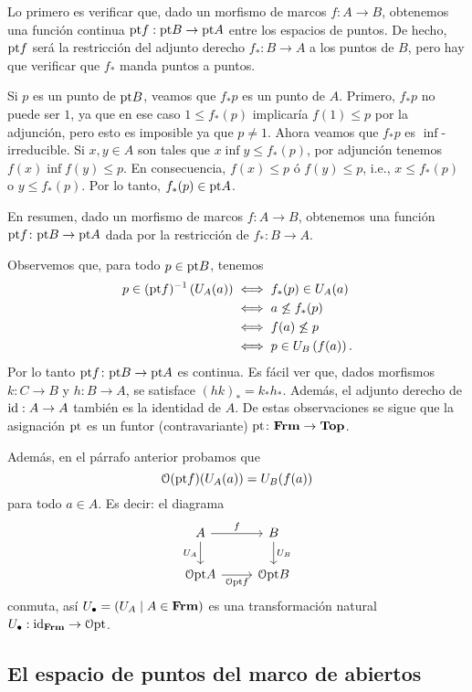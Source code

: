 \documentclass{comunicaciones}
\begin{document}
Lo primero es verificar que, dado un morfismo de marcos $f\colon A\to B$,
obtenemos una función continua $\mathrm{pt} f:\mathrm{pt} B\to\mathrm{pt} A$ entre los
espacios de puntos. De hecho, $\mathrm{pt} f$ será la restricción del adjunto
derecho $f_*\colon B\to A$ a los puntos de $B$, pero hay que verificar que
$f_*$ manda puntos a puntos.

Si $p$ es un punto de $\mathrm{pt} B$, veamos que $f_*p$ es un punto de $A$.
Primero, $f_*p$ no puede ser $1$, ya que en ese caso $1\leq f_\ast(p)$
implicaría $f(1)\leq p$ por la adjunción, pero esto es imposible ya
que $p\neq 1$.
Ahora veamos que $f_*p$ es $\inf$-irreducible. Si $x,y\in A$ son tales
que $x\inf y\leq f_\ast(p)$, por adjunción tenemos $f(x)\inf f(y)\leq p$.
En consecuencia, $f(x)\leq p$ ó $f(y)\leq p$, i.e., $x\leq f_\ast (p)$
o $y\leq f_\ast (p)$. Por lo tanto, $f_\ast (p)\in \mathrm{pt} A$.

En resumen, dado un morfismo de marcos $f\colon A\to B$, obtenemos una
función $\mathrm{pt} f \colon \mathrm{pt} B\to \mathrm{pt} A$ dada por la restricción de
$f_*:B\to A$.

Observemos que, para todo $p\in \mathcal{\mathrm{pt}} B$, tenemos
\begin{align*}
    p\in (\mathrm{pt} f)^{-1} \left(U_A(a)\right)&\iff f_\ast (p)\in U_A(a)\\
    &\iff a\not\leq f_\ast (p)\\
    &\iff f(a)\not\leq p\\
    &\iff p\in U_B\left(f(a)\right).
\end{align*}
Por lo tanto $\mathrm{pt} f\colon \mathrm{pt} B\to \mathrm{pt} A$ es continua.
Es fácil ver que, dados morfismos $k:C\to B$ y $h:B\to A$,
se satisface $(hk)_*=k_*h_*$. Además, el adjunto derecho de $\mathrm{id}:A\to A$ también es la identidad
de $A$.
De estas observaciones se sigue que la asignación $\mathrm{pt}$
es un funtor (contravariante) $\mathrm{pt}\colon \mathbf{Frm}\to\mathbf{Top}$.

Además, en el párrafo anterior probamos que
\[
    \mathcal{O}(\mathrm{pt} f)(U_A(a)) = U_B(f(a))
\]
para todo $a\in A$.
Es decir: el diagrama
\[
    \begin{tikzcd}
        A \ar[r,"f"] \ar[d,"U_A"'] & B \ar[d,"U_B"] \\
        \Cal O\pt A \ar[r,"\Cal O\pt f"'] & \Cal O\pt B
    \end{tikzcd}
\]
conmuta, así $U_\bullet=(U_A\mid A\in\mathbf{Frm})$
es una transformación natural $U_\bullet:\mathrm{id}_{\mathbf{Frm}}\to\mathcal{O}\mathrm{pt}$.

\subsection{El espacio de puntos del marco de abiertos}
\end{document}
